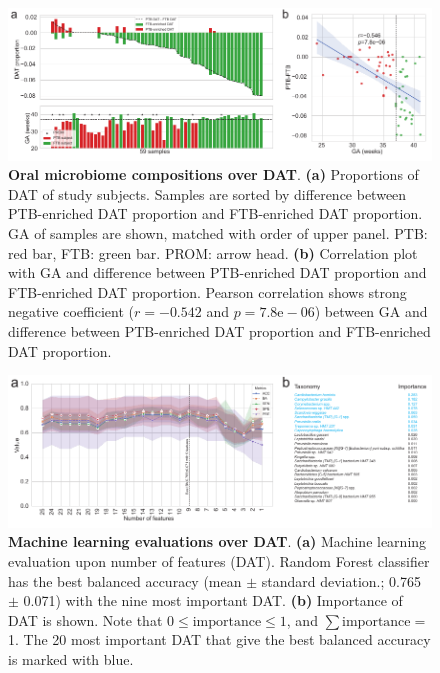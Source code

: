 \documentclass[11pt, a4paper, onecolumn, oneside]{report}
\begin{document}
            \begin{figure}[p]
                \centering
                \includegraphics[width=15 cm]{Figures/PTB/Fig2-Composition.pdf}
                \caption[Oral microbiome compositions over DAT]{\textbf{Oral microbiome compositions over DAT}. \textbf{(a)} Proportions of DAT of study subjects. Samples are sorted by difference between PTB-enriched DAT proportion and FTB-enriched DAT proportion. GA of samples are shown, matched with order of upper panel. PTB: red bar, FTB: green bar. PROM: arrow head. \textbf{(b)} Correlation plot with GA and difference between PTB-enriched DAT proportion and FTB-enriched DAT proportion. Pearson correlation shows strong negative coefficient ($r = -0.542$ and $p = 7.8\textrm{e}-06$) between GA and difference between PTB-enriched DAT proportion and FTB-enriched DAT proportion.}
                \label{fig:PTB-composition}
            \end{figure}
            \clearpage

            \begin{figure}[p]
                \centering
                \includegraphics[width=15 cm]{Figures/PTB/Fig3-ML.pdf}
                \caption[Machine learning evaluations over DAT]{\textbf{Machine learning evaluations over DAT}. \textbf{(a)} Machine learning evaluation upon number of features (DAT). Random Forest classifier has the best balanced accuracy (mean $\pm$ standard deviation.; 0.765 $\pm$ 0.071) with the nine most important DAT. \textbf{(b)} Importance of DAT is shown. Note that $0 \le \textrm{importance} \le 1$, and $\sum \textrm{importance} =$ 1. The 20 most important DAT that give the best balanced accuracy is marked with blue.}
                \label{fig:PTB-ML}
            \end{figure}
            \clearpage
\end{document}
